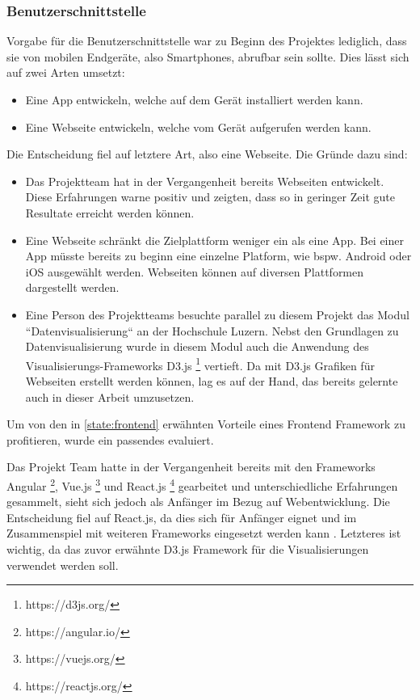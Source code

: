 \subsubsection{Benutzerschnittstelle}
Vorgabe für die Benutzerschnittstelle war zu Beginn des Projektes lediglich,
dass sie von mobilen Endgeräte, also Smartphones, abrufbar sein sollte.
Dies lässt sich auf zwei Arten umsetzt:
\begin{itemize}
    \item Eine App entwickeln, welche auf dem Gerät installiert werden kann.
    \item Eine Webseite entwickeln, welche vom Gerät aufgerufen werden kann.
\end{itemize}
Die Entscheidung fiel auf letztere Art, also eine Webseite.
Die Gründe dazu sind:
\begin{itemize}
    \item Das Projektteam hat in der Vergangenheit bereits Webseiten entwickelt.
          Diese Erfahrungen warne positiv und zeigten, dass so in geringer Zeit gute Resultate erreicht werden können.
    \item Eine Webseite schränkt die Zielplattform weniger ein als eine App.
          Bei einer App müsste bereits zu beginn eine einzelne Platform, wie bspw. Android oder iOS ausgewählt werden.
          Webseiten können auf diversen Plattformen dargestellt werden.
    \item Eine Person des Projektteams besuchte parallel zu diesem Projekt das Modul ``Datenvisualisierung``  an der Hochschule Luzern.
          Nebst den Grundlagen zu Datenvisualisierung wurde in diesem Modul auch die Anwendung des Visualisierungs-Frameworks D3.js \footnote{https://d3js.org/} vertieft.
          Da mit D3.js Grafiken für Webseiten erstellt werden können, lag es auf der Hand, das bereits gelernte auch in dieser Arbeit umzusetzen.
\end{itemize}

Um von den in \ref{state:frontend} erwähnten Vorteile eines Frontend Framework zu profitieren,
wurde ein passendes evaluiert.

Das Projekt Team hatte in der Vergangenheit bereits mit den Frameworks Angular \footnote{https://angular.io/}, Vue.js \footnote{https://vuejs.org/} und React.js \footnote{https://reactjs.org/} gearbeitet
und unterschiedliche Erfahrungen gesammelt, sieht sich jedoch als Anfänger im Bezug auf Webentwicklung.
Die Entscheidung fiel auf React.js, da dies sich für Anfänger eignet und im Zusammenspiel mit weiteren Frameworks eingesetzt werden kann \parencite{react_angular_vue}.
Letzteres ist wichtig, da das zuvor erwähnte D3.js Framework für die Visualisierungen verwendet werden soll.

